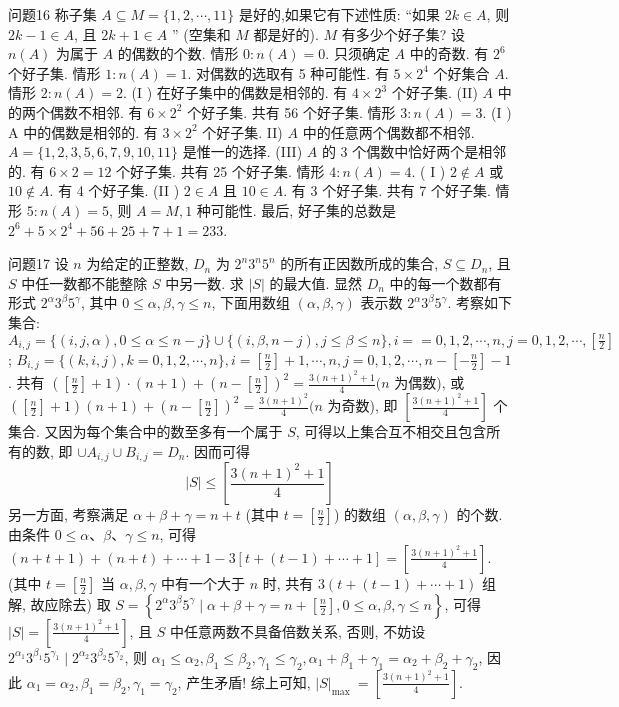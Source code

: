 问题16 称子集 $A \subseteq M=\{1,2, \cdots, 11\}$ 是好的,如果它有下述性质: “如果 $2 k \in A$, 则 $2 k-1 \in A$, 且 $2 k+1 \in A$ ” (空集和 $M$ 都是好的). $M$ 有多少个好子集?
设 $n(A)$ 为属于 $A$ 的偶数的个数.
情形 $0: n(A)=0$. 只须确定 $A$ 中的奇数.
有 $2^6$ 个好子集.
情形 $1: n(A)=1$. 对偶数的选取有 5 种可能性.
有 $5 \times 2^4$ 个好集合 $A$.
情形 $2: n(A)=2$. (I ) 在好子集中的偶数是相邻的.
有 $4 \times 2^3$ 个好子集.
(II) $A$ 中的两个偶数不相邻.
有 $6 \times 2^2$ 个好子集.
共有 56 个好子集.
情形 $3: n(A)=3$. (I ) A 中的偶数是相邻的.
有 $3 \times 2^2$ 个好子集.
II) $A$ 中的任意两个偶数都不相邻.
$A=\{1,2,3,5,6,7,9,10,11\}$ 是惟一的选择.
(III) $A$ 的 3 个偶数中恰好两个是相邻的.
有 $6 \times 2=12$ 个好子集.
共有 25 个好子集.
情形 $4: n(A)=4$. ( I ) $2 \notin A$ 或 $10 \notin A$. 有 4 个好子集.
(II ) $2 \in A$ 且 $10 \in A$. 有 3 个好子集.
共有 7 个好子集.
情形 $5: n(A)=5$, 则 $A=M, 1$ 种可能性.
最后, 好子集的总数是 $2^6+5 \times 2^4+56+25+7+1=233$.



问题17 设 $n$ 为给定的正整数, $D_n$ 为 $2^n 3^n 5^n$ 的所有正因数所成的集合, $S \subseteq D_n$, 且 $S$ 中任一数都不能整除 $S$ 中另一数.
求 $|S|$ 的最大值.
显然 $D_n$ 中的每一个数都有形式 $2^\alpha 3^\beta 5^\gamma$, 其中 $0 \leqslant \alpha, \beta, \gamma \leqslant n$, 下面用数组 $(\alpha, \beta, \gamma)$ 表示数 $2^\alpha 3^\beta 5^\gamma$. 考察如下集合: $A_{i, j}=\{(i, j, \alpha), 0 \leqslant \alpha \leqslant n- j\} \cup\{(i, \beta, n-j), j \leqslant \beta \leqslant n\}, i==0,1,2, \cdots, n, j=0,1,2, \cdots,\left[\frac{n}{2}\right]$; $B_{i, j}=\{(k, i, j), k=0,1,2, \cdots, n\}, i=\left[\frac{n}{2}\right]+1, \cdots, n, j=0,1,2, \cdots,n-\left[-\frac{n}{2}\right]-1$. 共有 $\left(\left[\frac{n}{2}\right]+1\right) \cdot(n+1)+\left(n-\left[\frac{n}{2}\right]\right)^2=\frac{3(n+1)^2+1}{4}(n$ 为偶数), 或 $\left(\left[\frac{n}{2}\right]+1\right)(n+1)+\left(n-\left[\frac{n}{2}\right]\right)^2=\frac{3(n+1)^2}{4}(n$ 为奇数), 即 $\left[\frac{3(n+1)^2+1}{4}\right]$ 个集合.
又因为每个集合中的数至多有一个属于 $S$, 可得以上集合互不相交且包含所有的数, 即 $\cup A_{i, j} \cup B_{i, j}=D_n$. 因而可得
$$
|S| \leqslant\left[\frac{3(n+1)^2+1}{4}\right]
$$
另一方面, 考察满足 $\alpha+\beta+\gamma=n+t$ (其中 $t=\left[\frac{n}{2}\right]$) 的数组 $(\alpha, \beta, \gamma)$ 的个数.
由条件 $0 \leqslant \alpha 、 \beta 、 \gamma \leqslant n$, 可得 $(n+t+1)+(n+t)+\cdots+1-3[t+ (t-1)+\cdots+1]=\left[\frac{3(n+1)^2+1}{4}\right]$. (其中 $t=\left[\frac{n}{2}\right]$ 当 $\alpha, \beta, \gamma$ 中有一个大于 $n$ 时, 共有 $3(t+(t-1)+\cdots+1)$ 组解, 故应除去) 取 $S= \left\{2^\alpha 3^\beta 5^\gamma \mid \alpha+\beta+\gamma=n+\left[\frac{n}{2}\right], 0 \leqslant \alpha, \beta, \gamma \leqslant n\right\}$, 可得 $|S|=\left[\frac{3(n+1)^2+1}{4}\right]$, 且 $S$ 中任意两数不具备倍数关系, 否则, 不妨设 $2^{\alpha_1} 3^{\beta_1} 5^{\gamma_1} \mid 2^{\alpha_2} 3^{\beta_2} 5^{\gamma_2}$, 则 $\alpha_1 \leqslant \alpha_2, \beta_1 \leqslant \beta_2, \gamma_1 \leqslant \gamma_2, \alpha_1+\beta_1+\gamma_1=\alpha_2+\beta_2+\gamma_2$, 因此 $\alpha_1=\alpha_2, \beta_1=\beta_2, \gamma_1=\gamma_2$, 产生矛盾! 综上可知, $|S|_{\text {max }}=\left[\frac{3(n+1)^2+1}{4}\right]$.


